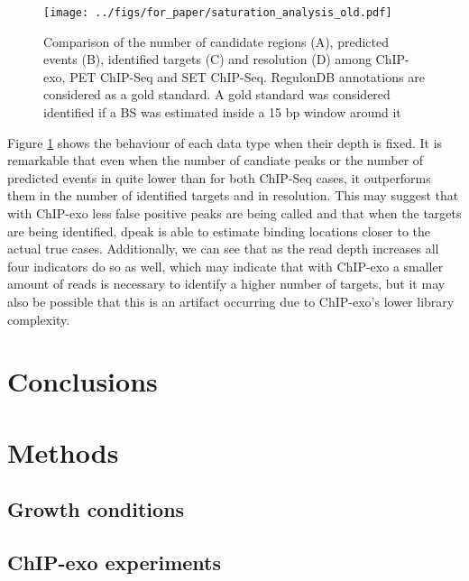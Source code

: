 \documentclass{bmcart}\usepackage[]{graphicx}\usepackage[]{color}
\begin{document}
\begin{figure}[h!]
  \centering
  \texttt{[image: ../figs/for\_paper/saturation\_analysis\_old.pdf]}
  \caption{Comparison of the number of candidate regions (A),
    predicted events (B), identified targets (C) and resolution (D)
    among ChIP-exo, PET ChIP-Seq and SET ChIP-Seq. RegulonDB
    annotations are considered as a gold standard. A gold standard was
    considered identified if a BS was estimated inside a 15
    bp window around it}
  \label{fig:design}
\end{figure}

Figure \ref{fig:design} shows the behaviour of each data type when
their depth is fixed. It is remarkable that even when the number of
candiate peaks or the number of predicted events in quite lower than
for both ChIP-Seq cases, it outperforms them in the number of
identified targets and in resolution. This may suggest that with
ChIP-exo less false positive peaks are being called and that when the
targets are being identified, dpeak is able to estimate binding
locations closer to the actual true cases. Additionally, we can see
that as the read depth increases all four indicators do so as well,
which may indicate that with ChIP-exo a smaller amount of reads is
necessary to identify a higher number of targets, but it may also be
possible that this is an artifact occurring due to ChIP-exo's lower
library complexity.

\section{Conclusions}
\label{sec:conclusions}



\newpage

\section{Methods}
\label{sec:methods}

\color{red}

\subsection{Growth conditions}
\label{sec:growth}


\subsection{ChIP-exo experiments}
\label{sec:experiments}
\end{document}
